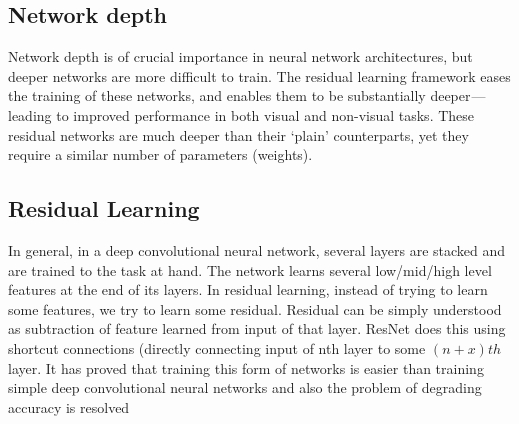 \documentclass[12pt]{article}
\numberwithin{equation}{section}
\numberwithin{table}{section}
\numberwithin{figure}{section}
\begin{document}
\subsection{Network depth}

Network depth is of crucial importance in neural network architectures, but deeper networks are more difficult to train. The residual learning framework eases the training of these networks, and enables them to be substantially deeper — leading to improved performance in both visual and non-visual tasks. These residual networks are much deeper than their ‘plain’ counterparts, yet they require a similar number of parameters (weights).

\subsection{Residual Learning}

In general, in a deep convolutional neural network, several layers are stacked and are trained to the task at hand. The network learns several low/mid/high level features at the end of its layers. In residual learning, instead of trying to learn some features, we try to learn some residual. Residual can be simply understood as subtraction of feature learned from input of that layer. ResNet does this using shortcut connections (directly connecting input of nth layer to some $(n+x)th$ layer. It has proved that training this form of networks is easier than training simple deep convolutional neural networks and also the problem of degrading accuracy is resolved
\end{document}
